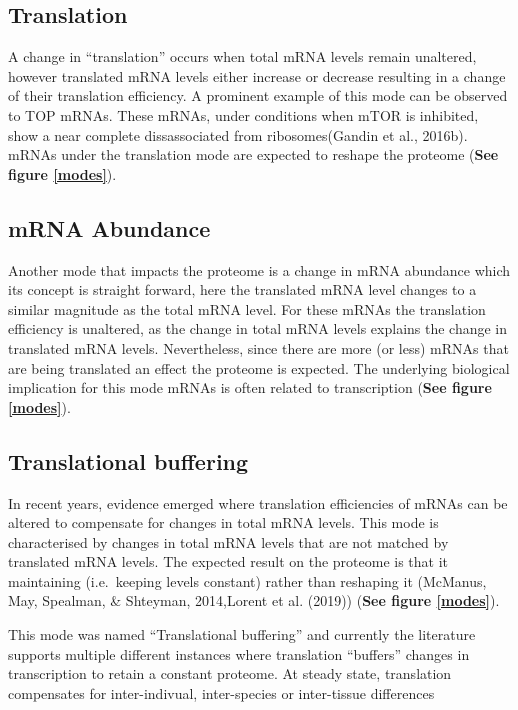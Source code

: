\documentclass[12pt,openany]{book}
\begin{document}
\subsection{Translation}

A change in ``translation'' occurs when total mRNA levels remain
unaltered, however translated mRNA levels either increase or decrease
resulting in a change of their translation efficiency. A prominent
example of this mode can be observed to TOP mRNAs. These mRNAs, under
conditions when mTOR is inhibited, show a near complete dissassociated
from ribosomes(Gandin et al., 2016b). mRNAs under the translation mode
are expected to reshape the proteome (\textbf{See figure \ref{modes}}).

\subsection{mRNA Abundance}

Another mode that impacts the proteome is a change in mRNA abundance
which its concept is straight forward, here the translated mRNA level
changes to a similar magnitude as the total mRNA level. For these mRNAs
the translation efficiency is unaltered, as the change in total mRNA
levels explains the change in translated mRNA levels. Nevertheless,
since there are more (or less) mRNAs that are being translated an effect
the proteome is expected. The underlying biological implication for this
mode mRNAs is often related to transcription (\textbf{See figure
\ref{modes}}).

\subsection{Translational buffering}

In recent years, evidence emerged where translation efficiencies of
mRNAs can be altered to compensate for changes in total mRNA levels.
This mode is characterised by changes in total mRNA levels that are not
matched by translated mRNA levels. The expected result on the proteome
is that it maintaining (i.e.~keeping levels constant) rather than
reshaping it (McManus, May, Spealman, \& Shteyman, 2014,Lorent et al.
(2019)) (\textbf{See figure \ref{modes}}).

This mode was named ``Translational buffering'' and currently the
literature supports multiple different instances where translation
``buffers'' changes in transcription to retain a constant proteome. At
steady state, translation compensates for inter-indivual, inter-species
or inter-tissue differences
\end{document}
